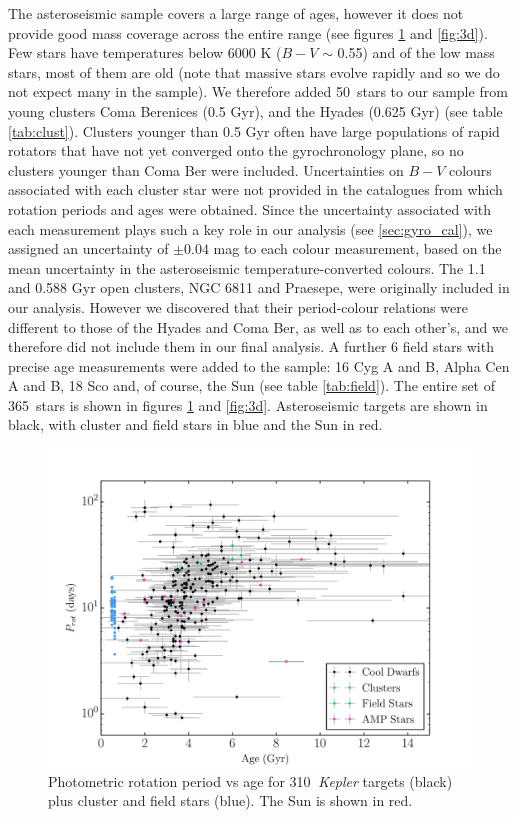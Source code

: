\documentclass[useAMS, usenatbib]{mn2e}
\newcommand{\nastero}{310}
\newcommand{\nHC}{50~}
\newcommand{\ntotal}{365~}
\begin{document}
The asteroseismic sample covers a large range of ages, however it does not
provide good mass coverage across the entire range (see figures
\ref{fig:p_vs_a} and \ref{fig:3d}).
Few stars have temperatures below 6000 K ($B-V$ $\sim$ 0.55) and of the low
mass stars, most of them are old (note that massive stars evolve rapidly and
so we do not expect many in the sample).
We therefore added \nHC stars to our sample from young clusters Coma Berenices
(0.5 Gyr), and the Hyades (0.625 Gyr) (see table \ref{tab:clust}).
Clusters younger than 0.5 Gyr often have large populations of rapid rotators
that have not yet converged onto the gyrochronology plane, so no clusters
younger than Coma Ber were included.
Uncertainties on $B-V$ colours associated with each cluster star were not
provided in the catalogues from which rotation periods and ages were obtained.
Since the uncertainty associated with each measurement plays such a key role
in our analysis (see \textsection \ref{sec:gyro_cal}), we assigned an
uncertainty of $\pm 0.04$ mag to each colour measurement, based on the mean
uncertainty in the asteroseismic temperature-converted colours.
The 1.1 and 0.588 Gyr open clusters, NGC 6811 and Praesepe, were originally
included in our analysis.
However we discovered that their period-colour relations were different to
those of the Hyades and Coma Ber, as well as to each other's, and we therefore
did not include them in our final analysis.
A further 6 field stars with precise age measurements were added to the
sample: 16 Cyg A and B, Alpha Cen A and B, 18 Sco and, of course, the Sun
(see table \ref{tab:field}).
The entire set of \ntotal stars is shown in figures \ref{fig:p_vs_a} and
\ref{fig:3d}.
Asteroseismic targets are shown in black, with cluster and field stars in blue
and the Sun in red.

\begin{figure}
\begin{center}
\includegraphics[width=6in, clip=true]{p_vs_a_paper2.pdf}
\caption{Photometric rotation period vs age for \nastero$~$ {\it Kepler}
	targets (black) plus cluster and field stars (blue). The Sun is shown
	in red.
\label{fig:p_vs_a}}
\end{center}
\end{figure}
\end{document}
